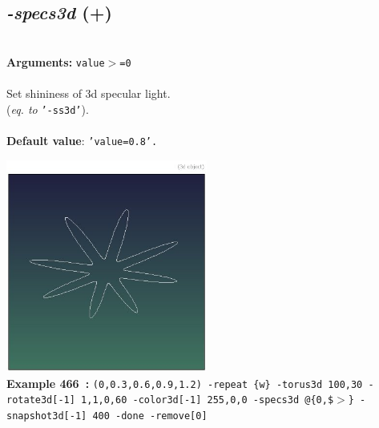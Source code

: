 \documentclass[a4paper,11pt,twoside]{book}
\begin{document}
\subsection{\emph{-specs3d} (+)}\vspace*{-0.5em}
~\\\textbf{Arguments: } 
{\small \texttt{value$>$=0}}\\~\\
Set shininess of 3d specular light.
~\\(\emph{eq. to} {\small \texttt{'-ss3d'}}).
~\\~\\\textbf{Default value}: {\small \texttt{'value=0.8'.}}
\begin{center}\includegraphics[keepaspectratio=true,height=7cm,width=\textwidth]{img/gmic_def466.jpg}\\
{\footnotesize \textbf{Example 466~:} \texttt{(0,0.3,0.6,0.9,1.2) -repeat \{w\} -torus3d 100,30 -rotate3d[-1] 1,1,0,60 -color3d[-1] 255,0,0 -specs3d @\{0,\$$>$\} -snapshot3d[-1] 400 -done -remove[0]}}
\end{center}
\end{document}
